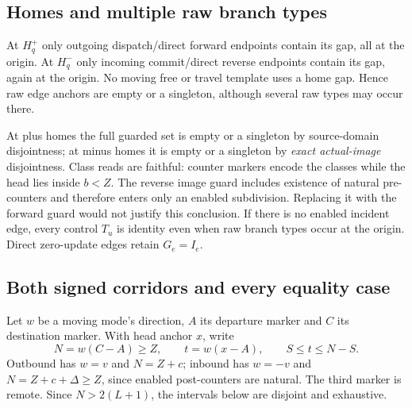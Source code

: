 \documentclass[11pt,a4paper]{article}
\numberwithin{equation}{section}
\begin{document}
\subsection{Homes and multiple raw branch types}
At $H_q^+$ only outgoing dispatch/direct forward endpoints contain its gap, all at the origin. At $H_q^-$ only incoming commit/direct reverse endpoints contain its gap, again at the origin. No moving free or travel template uses a home gap. Hence raw edge anchors are empty or a singleton, although several raw types may occur there.

At plus homes the full guarded set is empty or a singleton by source-domain disjointness; at minus homes it is empty or a singleton by \emph{exact actual-image} disjointness. Class reads are faithful: counter markers encode the classes while the head lies inside $b<Z$. The reverse image guard includes existence of natural pre-counters and therefore enters only an enabled subdivision. Replacing it with the forward guard would not justify this conclusion. If there is no enabled incident edge, every control $T_u$ is identity even when raw branch types occur at the origin. Direct zero-update edges retain $G_e=I_e$.

\subsection{Both signed corridors and every equality case}
Let $w$ be a moving mode's direction, $A$ its departure marker and $C$ its destination marker. With head anchor $x$, write
\[
N=w(C-A)\ge Z,\qquad t=w(x-A),\qquad S\le t\le N-S.
\]
Outbound has $w=v$ and $N=Z+c$; inbound has $w=-v$ and $N=Z+c+\Delta\ge Z$, since enabled post-counters are natural. The third marker is remote. Since $N>2(L+1)$, the intervals below are disjoint and exhaustive.
\end{document}
